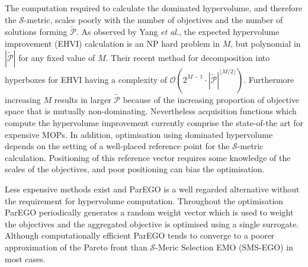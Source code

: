 \documentclass[conference]{IEEEtran}
\makeatletter
\newcommand{\nobj}{M}
\newcommand\hpv{dominated hypervolume\xspace}
\newcommand\smsego{SMS-EGO\xspace}
\newcommand\parego{ParEGO\xspace}
\newcommand\Papprox{\tilde{\mathcal{P}}}
\newcommand{\mnotejf}[2][\textcolor{blue}{\dagger}]{$#1$\marginpar{\color{blue}\raggedright\tiny$#1$ #2}}
\newcommand*{\etal}{\textit{et al.}\@\xspace}
\makeatother
\begin{document}
The computation required to calculate the \hpv, and therefore the $\mathcal{S}$-metric, scales poorly with the number of objectives and the number of solutions forming $\Papprox$. As observed by Yang \etal \cite{yangetal2019}, the expected hypervolume improvement (EHVI) calculation is an NP hard problem in $\nobj$, but polynomial in $|\Papprox|$ for any fixed value of $\nobj$. Their recent method for decomposition into hyperboxes for EHVI having a complexity of $\mathcal{O}(2^{\nobj-1}\cdot |\Papprox|^{\lfloor \nobj/2 \rfloor})$.  %
Furthermore increasing $M$ results in larger $\Papprox$ because of the increasing proportion of objective space that is mutually non-dominating. 
 Nevertheless acquisition functions which compute the hypervolume improvement currently comprise the state-of-the art for expensive MOPs. In addition, optimisation using \hpv depends on the setting of a well-placed reference point for the $\mathcal{S}$-metric calculation. Positioning of this reference vector requires some knowledge of the scales of the objectives, and poor positioning can bias the optimisation. 

Less expensive methods exist and \parego \cite{knowles2006parego} is a well regarded alternative without the requirement for hypervolume computation. Throughout the optimisation \parego periodically generates a random weight vector which is used to weight the objectives and  the aggregated objective is optimised using a single surrogate. Although computationally efficient \parego tends to converge to a poorer approximation of the Pareto front than $\mathcal{S}$-Meric Selection EMO (\smsego ) \cite{ponweiser2008multiobjective} in most cases.
\end{document}
